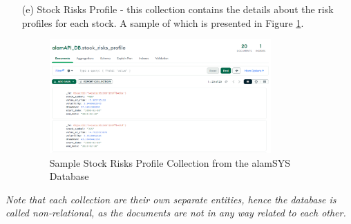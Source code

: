 \begin{itemize}
    \item[(e)] Stock Risks Profile  - this collection contains the details about the risk profiles
    for each stock. A sample of which is presented in Figure \ref{fig:odm_risk_sample}.
    \begin{figure}[ht]
        \centering
        \includegraphics[width=0.80\textwidth]{./assets/Chapter_3/ODM/ODM_Risks_Sample.png}
        \caption{Sample Stock Risks Profile Collection from the alamSYS Database}
        \label{fig:odm_risk_sample}
    \end{figure}
    \FloatBarrier

\end{itemize}
\textit{Note that each collection are their own separate entities, 
hence the database is called non-relational, as the documents are not in 
any way related to each other.}
\hfill \\